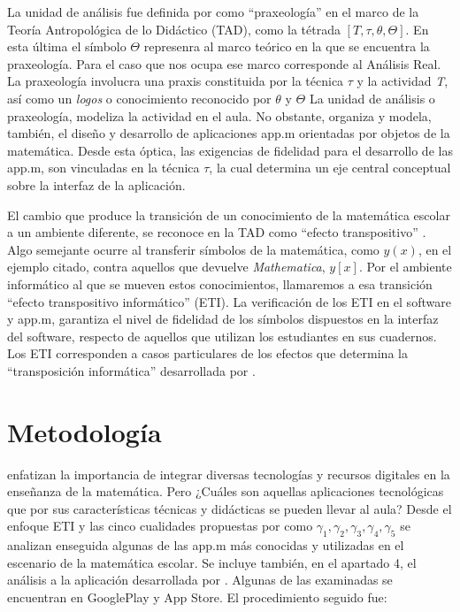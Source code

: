 \documentclass[spanish]{textolivre}
\begin{document}
La unidad de análisis fue definida por \textcite{chevallard2007} como “praxeología” en el marco de la Teoría Antropológica de lo Didáctico (TAD), como la tétrada $[T, \tau, \theta, \Theta]$. En esta última el símbolo $\Theta$ represenra al marco teórico en la que se encuentra la praxeología. Para el caso que nos ocupa ese marco corresponde al Análisis Real. La praxeología involucra una praxis constituida por la técnica $\tau$ y la actividad \emph{T}, así como un \emph{logos} o conocimiento reconocido por $\theta$ y $\Theta$  La unidad de análisis o praxeología, modeliza la actividad en el aula. No obstante, organiza y modela, también, el diseño y desarrollo de aplicaciones app.m orientadas por objetos de la matemática. Desde esta óptica, las exigencias de fidelidad para el desarrollo de las app.m, son vinculadas en la técnica $\tau$, la cual determina un eje central conceptual sobre la interfaz de la aplicación.

El cambio que produce la transición de un conocimiento de la matemática escolar a un ambiente diferente, se reconoce en la TAD como “efecto transpositivo” \cite{chevallard2007, castela2009}. Algo semejante ocurre al transferir símbolos de la matemática, como $y(x)$, en el ejemplo citado, contra aquellos que devuelve \emph{Mathematica}, $y[x]$. Por el ambiente informático al que se mueven estos conocimientos, llamaremos a esa transición “efecto transpositivo informático” (ETI). La verificación de los ETI en el software y app.m, garantiza el nivel de fidelidad de los símbolos dispuestos en la interfaz del software, respecto de aquellos que utilizan los estudiantes en sus cuadernos. Los ETI corresponden a casos particulares de los efectos que determina la “transposición informática” desarrollada por \textcite{balacheff}.

\section{Metodología}
\textcite{santostrigo2018} enfatizan la importancia de integrar diversas tecnologías y recursos digitales en la enseñanza de la matemática. Pero ¿Cuáles son aquellas aplicaciones tecnológicas que por sus características técnicas y didácticas se pueden llevar al aula? Desde el enfoque ETI y las cinco cualidades propuestas por \textcite{garcia2020} como $\gamma_1, \gamma_2, \gamma_3, \gamma_4, \gamma_5$ se analizan enseguida algunas de las app.m más conocidas y utilizadas en el escenario de la matemática escolar. Se incluye también, en el apartado 4, el análisis a la aplicación desarrollada por \textcite{garcia2020}. Algunas de las examinadas se encuentran en GooglePlay y App Store. El procedimiento seguido fue:
\end{document}
